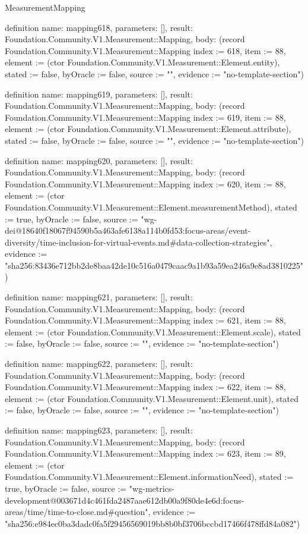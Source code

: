 \begin{lexlean}{MeasurementMapping}
\begin{semanticmodule}
definition{
  name: mapping618,
  parameters: [],
  result: Foundation.Community.V1.Measurement::Mapping,
  body: (record Foundation.Community.V1.Measurement::Mapping {index := 618, item := 88, element := (ctor Foundation.Community.V1.Measurement::Element.entity), stated := false, byOracle := false, source := "", evidence := "no-template-section"})
}

definition{
  name: mapping619,
  parameters: [],
  result: Foundation.Community.V1.Measurement::Mapping,
  body: (record Foundation.Community.V1.Measurement::Mapping {index := 619, item := 88, element := (ctor Foundation.Community.V1.Measurement::Element.attribute), stated := false, byOracle := false, source := "", evidence := "no-template-section"})
}

definition{
  name: mapping620,
  parameters: [],
  result: Foundation.Community.V1.Measurement::Mapping,
  body: (record Foundation.Community.V1.Measurement::Mapping {index := 620, item := 88, element := (ctor Foundation.Community.V1.Measurement::Element.measurementMethod), stated := true, byOracle := false, source := "wg-dei@18640f18067f94590b5a463afe6138a114b0fd53:focus-areas/event-diversity/time-inclusion-for-virtual-events.md#data-collection-strategies", evidence := "sha256:83436e712bb2de8baa42de10c516a0479caac9a1b93a59ea246a9e8ad3810225"})
}

definition{
  name: mapping621,
  parameters: [],
  result: Foundation.Community.V1.Measurement::Mapping,
  body: (record Foundation.Community.V1.Measurement::Mapping {index := 621, item := 88, element := (ctor Foundation.Community.V1.Measurement::Element.scale), stated := false, byOracle := false, source := "", evidence := "no-template-section"})
}

definition{
  name: mapping622,
  parameters: [],
  result: Foundation.Community.V1.Measurement::Mapping,
  body: (record Foundation.Community.V1.Measurement::Mapping {index := 622, item := 88, element := (ctor Foundation.Community.V1.Measurement::Element.unit), stated := false, byOracle := false, source := "", evidence := "no-template-section"})
}

definition{
  name: mapping623,
  parameters: [],
  result: Foundation.Community.V1.Measurement::Mapping,
  body: (record Foundation.Community.V1.Measurement::Mapping {index := 623, item := 89, element := (ctor Foundation.Community.V1.Measurement::Element.informationNeed), stated := true, byOracle := false, source := "wg-metrics-development@003671d4c461fda2487aae612db00a9f80de4e6d:focus-areas/time/time-to-close.md#question", evidence := "sha256:e984ec0ba3dadc0fa5f29456569019bb8b0bf3706bccbd17466f478ffd84a082"})
}


\end{semanticmodule}
\end{lexlean}
